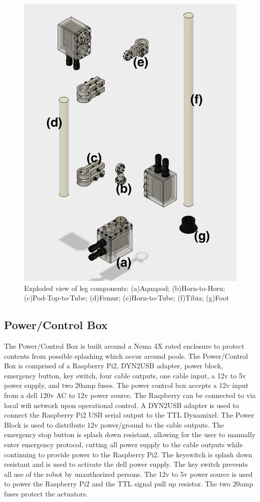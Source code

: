 \begin{figure}[h]
\centering
\includegraphics[width=1.0\columnwidth]{./img/aquaShoko-v3dot3-exploded-leg.png}
\caption{Exploded view of leg components: (a)Aquapod; (b)Horn-to-Horn; (c)Pod-Top-to-Tube; (d)Femur; (e)Horn-to-Tube; (f)Tibia; (g)Foot}
\label{fig:leg exploded}
\end{figure}
 

\subsection{Power/Control Box}
The Power/Control Box is built around a Nema 4X rated enclosure to protect contents from possible splashing which occur around pools. The Power/Control Box is comprised of a Raspberry Pi2, DYN2USB adapter, power block, emergency button, key switch, four cable outputs, one cable input, a 12v to 5v power supply, and two 20amp fuses. The power control box accepts a 12v input from a dell 120v AC to 12v power source.
The Raspberry can be connected to via local wifi network upon operational control. 
A DYN2USB adapter is used to connect the Raspberry Pi2 USB serial output to the TTL Dynamixel. 
The Power Block is used to distribute 12v power/ground to the cable outputs.
The emergency stop button is splash down resistant, allowing for the user to manually enter emergency protocol, cutting all power supply to the cable outputs while continuing to provide power to the Raspberry Pi2.
The keyswitch is splash down resistant and is used to activate the dell power supply. The key switch prevents all use of the robot by unauthorized persons. The 12v to 5v power source is used to power the Raspberry Pi2 and the TTL signal pull up resistor.
The two 20amp fuses protect the actuators.


